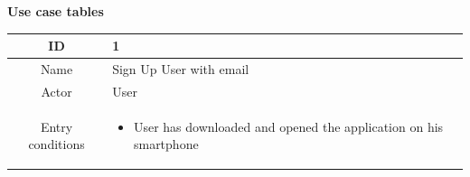 \documentclass[table, 12pt]{article}
\begin{document}
\textbf{Use case tables}

\begin{longtable}{ | c | p{10cm} | }

    \hline
    ID               & 1                                                                                                                                                                                                                                                                      \\ \hline
    Name             & Sign Up User with email                                                                                                                                                                                                                                                \\
    \hline
    Actor            & User                                                                                                                                                                                                                                                                   \\
    \hline
    Entry conditions &
    \begin{itemize}
        \item User has downloaded and opened the application on his smartphone
    \end{itemize}
    \\
    \hline


\end{longtable}
\end{document}
